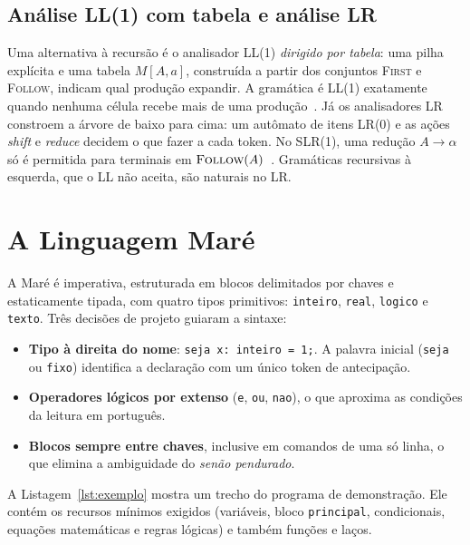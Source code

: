 \documentclass[conference]{IEEEtran}
\begin{document}
\subsection{Análise LL(1) com tabela e análise LR}
Uma alternativa à recursão é o analisador LL(1) \emph{dirigido por tabela}: uma
pilha explícita e uma tabela $M[A,a]$, construída a partir dos conjuntos
\textsc{First} e \textsc{Follow}, indicam qual produção expandir. A gramática é
LL(1) exatamente quando nenhuma célula recebe mais de uma produção~\cite{aho2006}.
Já os analisadores LR constroem a árvore de baixo para cima: um autômato de
itens LR(0) e as ações \emph{shift} e \emph{reduce} decidem o que fazer a cada
token. No SLR(1), uma redução $A\to\alpha$ só é permitida para terminais em
$\textsc{Follow}(A)$~\cite{aho2006,grune2008}. Gramáticas recursivas à esquerda,
que o LL não aceita, são naturais no LR.

\section{A Linguagem Maré}\label{sec:lingua}

A Maré é imperativa, estruturada em blocos delimitados por chaves e
estaticamente tipada, com quatro tipos primitivos: \texttt{inteiro},
\texttt{real}, \texttt{logico} e \texttt{texto}. Três decisões de projeto
guiaram a sintaxe:

\begin{itemize}
\item \textbf{Tipo à direita do nome}: \texttt{seja x: inteiro = 1;}. A
palavra inicial (\texttt{seja} ou \texttt{fixo}) identifica a declaração com
um único token de antecipação.
\item \textbf{Operadores lógicos por extenso} (\texttt{e}, \texttt{ou},
\texttt{nao}), o que aproxima as condições da leitura em português.
\item \textbf{Blocos sempre entre chaves}, inclusive em comandos de uma só
linha, o que elimina a ambiguidade do \textit{senão pendurado}.
\end{itemize}

A Listagem~\ref{lst:exemplo} mostra um trecho do programa de demonstração.
Ele contém os recursos mínimos exigidos (variáveis, bloco
\texttt{principal}, condicionais, equações matemáticas e regras lógicas) e
também funções e laços.
\end{document}
